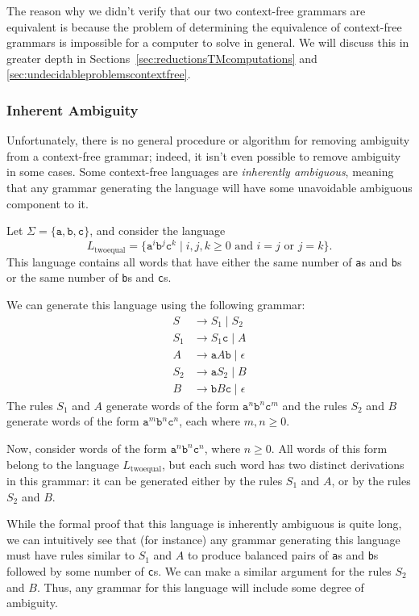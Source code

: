 \begin{remark}
The reason why we didn't verify that our two context-free grammars are equivalent is because the problem of determining the equivalence of context-free grammars is impossible for a computer to solve in general. We will discuss this in greater depth in Sections~\ref{sec:reductionsTMcomputations} and \ref{sec:undecidableproblemscontextfree}.
\end{remark}

\subsubsection*{Inherent Ambiguity}

Unfortunately, there is no general procedure or algorithm for removing ambiguity from a context-free grammar; indeed, it isn't even possible to remove ambiguity in some cases. Some context-free languages are \emph{inherently ambiguous}, meaning that any grammar generating the language will have some unavoidable ambiguous component to it.

\begin{example}
Let $\Sigma = \{\texttt{a}, \texttt{b}, \texttt{c}\}$, and consider the language
\begin{equation*}
L_{\text{twoequal}} = \{\texttt{a}^{i}\texttt{b}^{j}\texttt{c}^{k} \mid i, j, k \geq 0 \text{ and } i = j \text { or } j = k\}.
\end{equation*}
This language contains all words that have either the same number of \texttt{a}s and \texttt{b}s or the same number of \texttt{b}s and \texttt{c}s.

We can generate this language using the following grammar:
\begin{align*}
S		&\rightarrow S_{1} \mid S_{2} \\
S_{1}	&\rightarrow S_{1}\texttt{c} \mid A \\
A		&\rightarrow \texttt{a}A\texttt{b} \mid \epsilon \\
S_{2}	&\rightarrow \texttt{a}S_{2} \mid B \\
B		&\rightarrow \texttt{b}B\texttt{c} \mid \epsilon
\end{align*}
The rules $S_{1}$ and $A$ generate words of the form $\texttt{a}^{n}\texttt{b}^{n}\texttt{c}^{m}$ and the rules $S_{2}$ and $B$ generate words of the form $\texttt{a}^{m}\texttt{b}^{n}\texttt{c}^{n}$, each where $m, n \geq 0$.

Now, consider words of the form $\texttt{a}^{n}\texttt{b}^{n}\texttt{c}^{n}$, where $n \geq 0$. All words of this form belong to the language $L_{\text{twoequal}}$, but each such word has two distinct derivations in this grammar: it can be generated either by the rules $S_{1}$ and $A$, or by the rules $S_{2}$ and $B$.

While the formal proof that this language is inherently ambiguous is quite long, we can intuitively see that (for instance) any grammar generating this language must have rules similar to $S_{1}$ and $A$ to produce balanced pairs of \texttt{a}s and \texttt{b}s followed by some number of \texttt{c}s. We can make a similar argument for the rules $S_{2}$ and $B$. Thus, any grammar for this language will include some degree of ambiguity.
\end{example}

